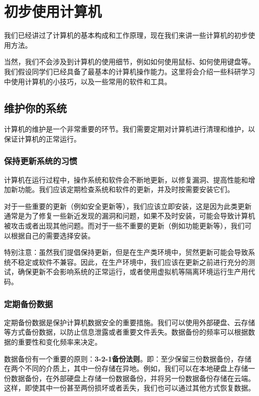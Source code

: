 \documentclass[../main.tex]{subfiles}
\begin{document}
\chapter{初步使用计算机}

我们已经讲过了计算机的基本构成和工作原理，现在我们来讲一些计算机的初步使用方法。

当然，我们不会涉及到计算机的使用细节，例如如何使用鼠标、如何使用键盘等。我们假设同学们已经具备了最基本的计算机操作能力。这里将会介绍一些科研学习中使用计算机的小技巧，以及一些常用的软件和工具。

\section{维护你的系统}

计算机的维护是一个非常重要的环节。我们需要定期对计算机进行清理和维护，以保证计算机的正常运行。

\subsection{保持更新系统的习惯}

计算机在运行过程中，操作系统和软件会不断地更新，以修复漏洞、提高性能和增加新功能。我们应该定期检查系统和软件的更新，并及时按需要安装它们。

对于一些重要的更新（例如安全更新等），我们应该立即安装，这是因为此类更新通常是为了修复一些新近发现的漏洞和问题，如果不及时安装，可能会导致计算机被攻击或者出现其他问题。而对于一些不重要的更新（例如功能更新等），我们可以根据自己的需要选择安装。

特别注意：虽然我们提倡保持更新，但是在生产类环境中，贸然更新可能会导致系统不稳定或软件不兼容。因此，在生产环境中，我们应该在更新之前进行充分的测试，确保更新不会影响系统的正常运行，或者使用虚拟机等隔离环境运行生产用代码。

\subsection{定期备份数据}

定期备份数据是保护计算机数据安全的重要措施。我们可以使用外部硬盘、云存储等方式备份数据，以防止信息泄露或者重要文件丢失。数据备份的频率可以根据数据的重要性和变化频率来决定。

数据备份有一个重要的原则：\textbf{3-2-1备份法则}。即：至少保留三份数据备份，存储在两个不同的介质上，其中一份存储在异地。例如，我们可以在本地硬盘上存储一份数据备份，在外部硬盘上存储一份数据备份，并将另一份数据备份存储在云端。这样，即使其中一份甚至两份损坏或者丢失，我们也可以通过其他方式恢复数据。
\end{document}

